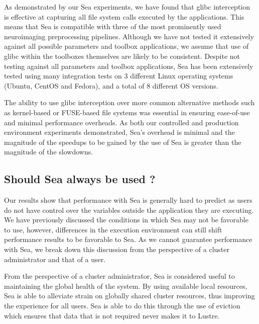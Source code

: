 \documentclass[fleqn,10pt]{wlscirep}
\begin{document}
    As demonstrated by our Sea experiments, we have found that glibc interception
    is effective at capturing all file system calls executed by the
    applications. This means that Sea is compatible with three of the most
    prominently used neuroimaging preprocessing pipelines. Although we have not
    tested it extensively against all possible parameters and toolbox
    applications, we assume that use of glibc within the toolboxes themselves are
    likely to be consistent. Despite not testing against all parameters and
    toolbox applications, Sea has been extensively tested using many integration
    tests on 3 different Linux operating systems (Ubuntu, CentOS and Fedora),
    and a total of 8 different OS versions.

    The ability to use glibc interception over more common alternative methods
    such as kernel-based or FUSE-based file systems was essential in ensuring
    ease-of-use and minimal performance overheads. As both our controlled and
    production environment experiments demonstrated, Sea's overhead is minimal
    and the magnitude of the speedups to be gained by the use of Sea is
    greater than the magnitude of the slowdowns.
    
    \subsection{Should Sea always be used ?}
    
    Our results show that performance with Sea is generally hard to predict as
    users do not have control over the variables outside the application they
    are executing. We have previously discussed the conditions in which Sea may
    not be favorable to use, however, differences in the execution environment
    can still shift performance results to be favorable to Sea. As we cannot
    guarantee performance with Sea, we break down this discussion from the
    perspective of a cluster administrator and that of a user.

    From the perspective of a cluster administrator, Sea is considered useful to
    maintaining the global health of the system. By using available local
    resources, Sea is able to alleviate strain on globally shared cluster
    resources, thus improving the experience for all users. Sea is able to do
    this through the use of eviction which ensures that data that is not
    required never makes it to Lustre.
\end{document}
